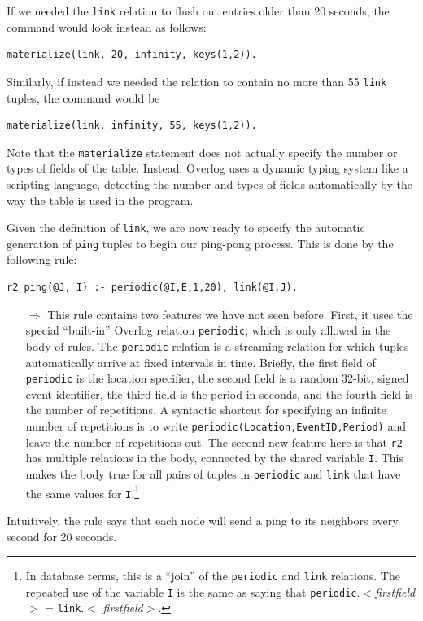 \documentclass{article}
\begin{document}
If we needed the \lstinline$link$ relation to flush out entries older
than 20 seconds, the command would look instead as follows:
\begin{lstlisting}
materialize(link, 20, infinity, keys(1,2)).
\end{lstlisting}
Similarly, if instead we needed the relation to contain no more than 55
\lstinline$link$ tuples, the command would be
\begin{lstlisting}
materialize(link, infinity, 55, keys(1,2)).
\end{lstlisting}


Note that the \lstinline$materialize$ statement does not actually
specify the number or types of fields of the table.  Instead, Overlog
uses a dynamic typing system like a scripting language, detecting the number and types of
fields automatically by the way the table is used in the program.

Given the definition of \lstinline$link$, we are now ready to specify
the automatic generation of \lstinline$ping$ tuples to begin our
ping-pong process.  This is done by the following rule:
\begin{lstlisting}
r2 ping(@J, I) :- periodic(@I,E,1,20), link(@I,J).
\end{lstlisting}

\begin{itemize}
\item[$\Longrightarrow$] This rule contains two features we have not
  seen before.  First, it uses the special ``built-in'' Overlog relation
  \lstinline$periodic$, which is only allowed in the body of rules.  The
  \lstinline$periodic$ relation is a streaming relation for which tuples
  automatically arrive at fixed intervals in time. Briefly, the first
  field of \lstinline$periodic$ is the location specifier, the second
  field is a random 32-bit, signed event identifier, the third field is
  the period in seconds, and the fourth field is the number of
  repetitions. A syntactic shortcut for specifying an infinite number of
  repetitions is to write \lstinline$periodic(Location,EventID,Period)$
  and leave the number of repetitions out.
  The second new feature here is that \lstinline$r2$ has multiple
  relations in the body, connected by the shared variable \lstinline$I$.
  This makes the body true for all pairs of tuples in
  \lstinline$periodic$ and \lstinline$link$ that have the same values
  for \lstinline$I$.\footnote{In database terms, this is a ``join'' of
  the \lstinline$periodic$ and \lstinline$link$ relations.  The repeated
  use of the variable \lstinline$I$ is the same as saying that
  \lstinline$periodic$.$<${\em firstfield}$>$ = \lstinline$link$.$<${\em
  firstfield}$>$.}
\end{itemize}
\noindent
Intuitively, the rule says that each node will send a ping to its
neighbors every second for 20 seconds.
\end{document}
